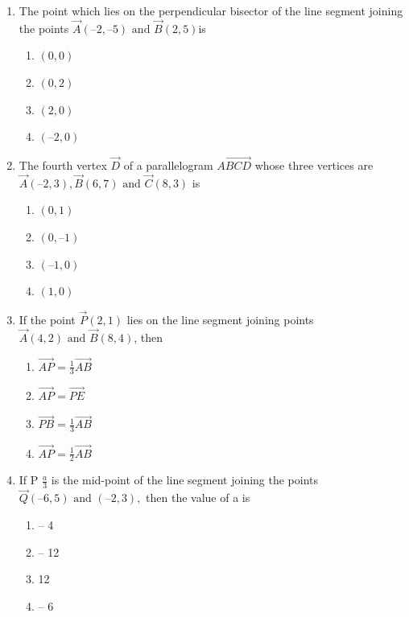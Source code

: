 \begin{enumerate}[label=\thesection.\arabic*,ref=\thesection.\theenumi]
\item The point which lies on the perpendicular bisector of the line segment joining the
	points $\vec{A} (–2, –5)\text { and } \vec{B} (2, 5) $is
\begin{enumerate}
\item  	$(0, 0)$
\item  $(0, 2)$ 
\item  $(2, 0)$ 
\item  $(–2, 0)$
\end{enumerate}
\item The fourth vertex $\vec{D}$ of a parallelogram $\vec{ABCD}$ whose three vertices are
	$\vec{A} (–2, 3), \vec{B} (6, 7)\text { and } \vec{C} (8, 3)$ is
\begin{enumerate}
	\item $(0, 1)$
	\item $(0, –1)$
	\item $ (–1,0)$
	\item$(1, 0)$
\end{enumerate}
\item If the point $\vec{P} (2, 1)$ lies on the line segment joining points$\vec{A} (4, 2) \text{ and } \vec{B} (8, 4)$,
then
\begin{enumerate}
	\item $\vec{AP} =\frac{1}{3}\vec{AB}$ 
\item $\vec{AP}=\vec{PE}$
\item $\vec{PB}=\frac{1}{3}\vec{AB}$
\item$\vec{AP}=\frac{1}{2}\vec{AB}$
 \end{enumerate}
 \item If P $\frac{a}{3}$ is the mid-point of the line segment joining the points $\vec{Q} (– 6, 5) \text{ and }(– 2, 3),$ then the value of a is
\begin{enumerate}
\item – 4
\item – 12
\item 12
\item – 6
\end{enumerate}


\end{enumerate}

